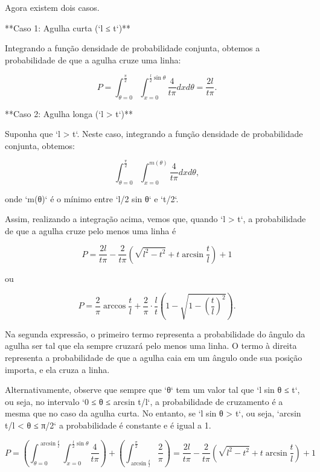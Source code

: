 Agora existem dois casos.

**Caso 1: Agulha curta (`l ≤ t`)**

Integrando a função densidade de probabilidade conjunta, obtemos a probabilidade de que a agulha cruze uma linha:

$$
P = \int_{\theta=0}^{\frac{\pi}{2}} \int_{x=0}^{\frac{l}{2}\sin\theta} \frac{4}{t\pi} dx d\theta = \frac{2l}{t\pi}.
$$

**Caso 2: Agulha longa (`l > t`)**

Suponha que `l > t`. Neste caso, integrando a função densidade de probabilidade conjunta, obtemos:

$$
\int_{\theta=0}^{\frac{\pi}{2}} \int_{x=0}^{m(\theta)} \frac{4}{t\pi} dx d\theta,
$$

onde `m(θ)` é o mínimo entre `l/2 sin θ` e `t/2`.

Assim, realizando a integração acima, vemos que, quando `l > t`, a probabilidade de que a agulha cruze pelo menos uma linha é

$$
P = \frac{2l}{t\pi} - \frac{2}{t\pi} \left(\sqrt{l^{2}-t^{2}}+t\arcsin \frac{t}{l}\right) + 1
$$

ou

$$
P = \frac{2}{\pi} \arccos \frac{t}{l} + \frac{2}{\pi} \cdot \frac{l}{t} \left(1-\sqrt{1-\left(\frac{t}{l}\right)^{2}}\right).
$$

Na segunda expressão, o primeiro termo representa a probabilidade do ângulo da agulha ser tal que ela sempre cruzará pelo menos uma linha. O termo à direita representa a probabilidade de que a agulha caia em um ângulo onde sua posição importa, e ela cruza a linha.

Alternativamente, observe que sempre que `θ` tem um valor tal que `l sin θ ≤ t`, ou seja, no intervalo `0 ≤ θ ≤ arcsin t/l`, a probabilidade de cruzamento é a mesma que no caso da agulha curta. No entanto, se `l sin θ > t`, ou seja, `arcsin t/l < θ ≤ π/2` a probabilidade é constante e é igual a 1.

$$
P = \left(\int_{\theta=0}^{\arcsin \frac{t}{l}} \int_{x=0}^{\frac{l}{2}\sin\theta} \frac{4}{t\pi}\right) + \left(\int_{\arcsin \frac{t}{l}}^{\frac{\pi}{2}} \frac{2}{\pi}\right) = \frac{2l}{t\pi} - \frac{2}{t\pi} \left(\sqrt{l^{2}-t^{2}}+t\arcsin \frac{t}{l}\right) + 1
$$